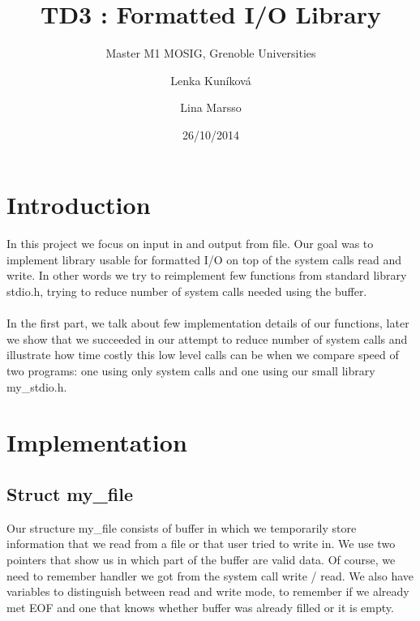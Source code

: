 \documentclass[a4paper,10pt]{article}
\title{TD3 : Formatted I/O Library}
\subtitle{Master M1 MOSIG, Grenoble Universities}
\author{Lenka Kun\'{i}kov\'{a} \and Lina Marsso}
\date{26/10/2014}
\begin{document}


\maketitle



\section{Introduction}
	\paragraph{}
	In this project we focus on input in and output from file. Our goal was to implement library usable for formatted I/O on top of the system calls read and write. In other words we try to reimplement few functions from standard library stdio.h, trying to reduce number of system calls needed using the buffer.
	\paragraph{}
	In the first part, we talk about few implementation details of our functions, later we show that we succeeded in our attempt to reduce number of system calls and illustrate how time costly this low level calls can be when we compare speed of two programs: one using only system calls and one using our small library my\_stdio.h.



\section{Implementation}	
\subsection{Struct my\_file}
 Our structure my\_file consists of buffer in which we temporarily store information that we read from a file or that user tried to write in. We use two pointers that show us in which part of the buffer are valid data. Of course, we need to remember handler we got from the system call write / read. We also have variables to distinguish between read and write mode, to remember if we already met EOF and one that knows whether buffer was already filled or it is empty.  
\end{document}
